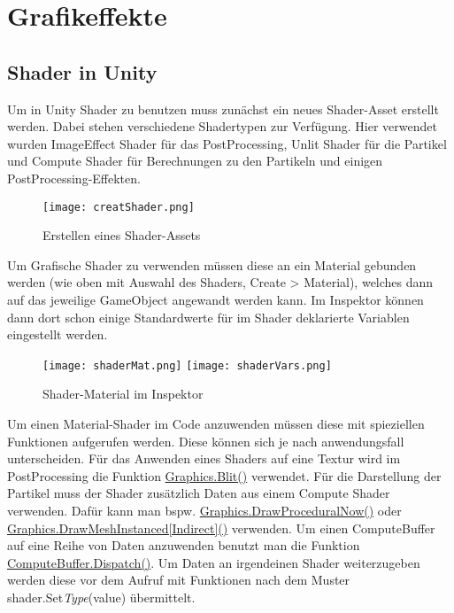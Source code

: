 \documentclass[a4paper,ngerman,12pt]{report}
\begin{document}
\chapter{Grafikeffekte}




\section{Shader in Unity}

Um in Unity Shader zu benutzen muss zunächst ein neues Shader-Asset erstellt werden. Dabei stehen verschiedene Shadertypen zur Verfügung. Hier verwendet wurden ImageEffect Shader für das PostProcessing, Unlit Shader für die Partikel und Compute Shader für Berechnungen zu den Partikeln und einigen PostProcessing-Effekten. 

\begin{figure}[H]
\centering
\texttt{[image: creatShader.png]}
\caption{Erstellen eines Shader-Assets}
\label{img:creatShader}
\end{figure}

Um Grafische Shader zu verwenden müssen diese an ein Material gebunden werden (wie oben mit Auswahl des Shaders, Create > Material), welches dann auf das jeweilige GameObject angewandt werden kann. Im Inspektor können dann dort schon einige Standardwerte für im Shader deklarierte Variablen eingestellt werden.

\begin{figure}[H]
\centering
\texttt{[image: shaderMat.png]}
\texttt{[image: shaderVars.png]}
\caption{Shader-Material im Inspektor}
\label{img:shaderMat}
\end{figure}

Um einen Material-Shader im Code anzuwenden müssen diese mit spieziellen Funktionen aufgerufen werden. Diese können sich je nach anwendungsfall unterscheiden. Für das Anwenden eines Shaders auf eine Textur wird im PostProcessing die Funktion \href{https://docs.unity3d.com/ScriptReference/Graphics.Blit.html}{Graphics.Blit()} verwendet. Für die Darstellung der Partikel muss der Shader zusätzlich Daten aus einem Compute Shader verwenden. Dafür kann man bspw. \href{https://docs.unity3d.com/ScriptReference/Graphics.DrawProceduralNow.html}{Graphics.DrawProceduralNow()} oder \href{https://docs.unity3d.com/ScriptReference/Graphics.DrawMeshInstanced.html}{Graphics.DrawMeshInstanced[Indirect]()} verwenden. Um einen ComputeBuffer auf eine Reihe von Daten anzuwenden benutzt man die Funktion \href{https://docs.unity3d.com/ScriptReference/ComputeShader.Dispatch.html}{ComputeBuffer.Dispatch()}. Um Daten an irgendeinen Shader weiterzugeben werden diese vor dem Aufruf mit Funktionen nach dem Muster shader.Set\textit{Type}(value) übermittelt.
\end{document}
